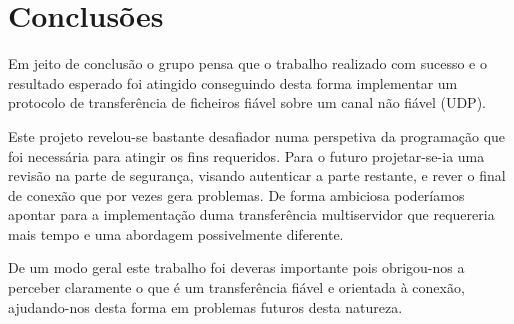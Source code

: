 \documentclass{llncs}
\begin{document}
\newpage
\section{Conclusões}

Em jeito de conclusão o grupo pensa que o trabalho realizado com sucesso e o resultado esperado foi atingido conseguindo desta forma implementar um protocolo de transferência de ficheiros fiável sobre um canal não fiável (UDP).

Este projeto revelou-se bastante desafiador numa perspetiva da programação que foi necessária para atingir os fins requeridos. Para o futuro projetar-se-ia uma revisão na parte de segurança, visando autenticar a parte restante, e rever o final de conexão que por vezes gera problemas. De forma ambiciosa poderíamos apontar para a implementação duma transferência multiservidor que requereria mais tempo e uma abordagem possivelmente diferente.

De um modo geral este trabalho foi deveras importante pois obrigou-nos a perceber claramente o que é um transferência fiável e orientada à conexão, ajudando-nos desta forma em problemas futuros desta natureza.
\end{document}
